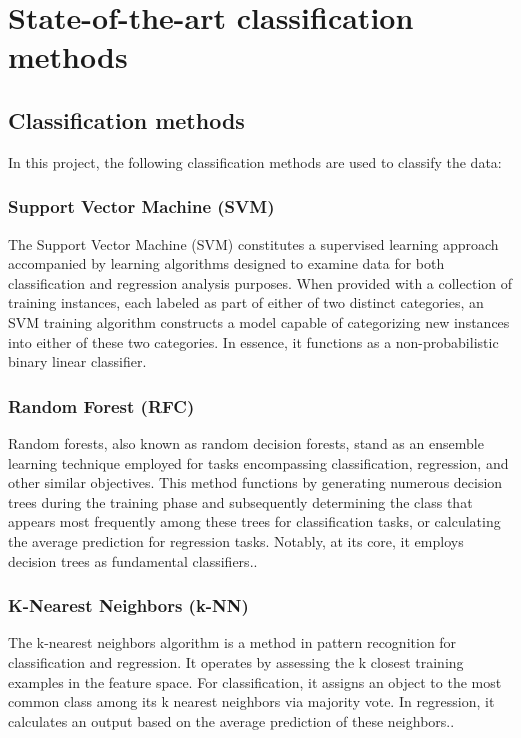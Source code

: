 \section{State-of-the-art classification methods}

\subsection{Classification methods}
	In this project, the following classification methods are used to classify the data:

	\subsubsection*{Support Vector Machine (SVM)}
		The Support Vector Machine (SVM) constitutes a supervised learning approach accompanied by learning algorithms designed to examine data for both classification and regression analysis purposes. When provided with a collection of training instances, each labeled as part of either of two distinct categories, an SVM training algorithm constructs a model capable of categorizing new instances into either of these two categories. In essence, it functions as a non-probabilistic binary linear classifier\cite{suthaharan2016support}.
	
	\subsubsection*{Random Forest (RFC)}
		Random forests, also known as random decision forests, stand as an ensemble learning technique employed for tasks encompassing classification, regression, and other similar objectives. This method functions by generating numerous decision trees during the training phase and subsequently determining the class that appears most frequently among these trees for classification tasks, or calculating the average prediction for regression tasks. Notably, at its core, it employs decision trees as fundamental classifiers.\cite{belgiu2016random}. 
	
	\subsubsection*{K-Nearest Neighbors (k-NN)}
		The k-nearest neighbors algorithm is a method in pattern recognition for classification and regression. It operates by assessing the k closest training examples in the feature space. For classification, it assigns an object to the most common class among its k nearest neighbors via majority vote. In regression, it calculates an output based on the average prediction of these neighbors.\cite{kramer2013k}.

